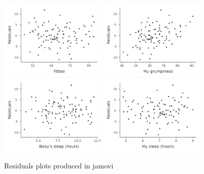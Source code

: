\documentclass[
  a4paper,
]{book}
\begin{document}
\begin{figure}

\begin{minipage}[t]{\linewidth}

{\centering 

\includegraphics[width=0.45\textwidth,height=\textheight]{images/fig12-20a.png}
\includegraphics[width=0.45\textwidth,height=\textheight]{images/fig12-20b.png}
\includegraphics[width=0.45\textwidth,height=\textheight]{images/fig12-20c.png}
\includegraphics[width=0.45\textwidth,height=\textheight]{images/fig12-20d.png}

}

\end{minipage}%

\caption{\label{fig-fig12-20}Residuals plots produced in jamovi}

\end{figure}
\end{document}
